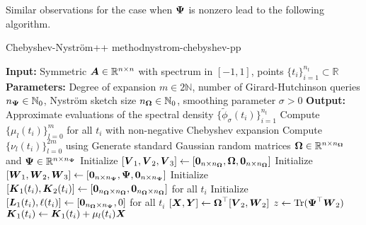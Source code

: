 \documentclass[12pt]{article}
\begin{document}
Similar observations for the case when $\boldsymbol{\Psi}$ is nonzero lead to the following algorithm.

\begin{algo}{Chebyshev-Nyström++ method}{nystrom-chebyshev-pp}
\begin{algorithmic}[1]
    \Statex \textbf{Input:} Symmetric $\boldsymbol{A} \in \mathbb{R}^{n \times n}$ with spectrum in $[-1, 1]$, points $\{t_i\}_{i=1}^{n_t} \subset \mathbb{R}$
    \Statex \textbf{Parameters:} Degree of expansion $m \in 2\mathbb{N}$, number of Girard-Hutchinson queries $n_{\boldsymbol{\Psi}} \in \mathbb{N}_0$, Nyström sketch size $n_{\boldsymbol{\Omega}} \in \mathbb{N}_0$,  smoothing parameter $\sigma > 0$
    \Statex \textbf{Output:} Approximate evaluations of the spectral density $\{\widetilde{\phi}_{\sigma}(t_i)\}_{i=1}^{n_t}$
    \State Compute $\{\mu_l(t_i)\}_{l=0}^{m}$ for all $t_i$ with non-negative Chebyshev expansion 
    \State Compute $\{\nu_l(t_i)\}_{l=0}^{2m}$ using %
    \State Generate standard Gaussian random matrices $\boldsymbol{\Omega} \in \mathbb{R}^{n \times n_{\boldsymbol{\Omega}}}$ and $\boldsymbol{\Psi} \in \mathbb{R}^{n \times n_{\boldsymbol{\Psi}}}$%
    \State Initialize $[\boldsymbol{V}_1, \boldsymbol{V}_2, \boldsymbol{V}_3] \gets [\boldsymbol{0}_{n \times n_{\boldsymbol{\Omega}}}, \boldsymbol{\boldsymbol{\Omega}}, \boldsymbol{0}_{n \times n_{\boldsymbol{\Omega}}}]$
    \State Initialize $[\boldsymbol{W}_1, \boldsymbol{W}_2, \boldsymbol{W}_3] \gets [\boldsymbol{0}_{n \times n_{\boldsymbol{\Psi}}}, \boldsymbol{\Psi}, \boldsymbol{0}_{n \times n_{\boldsymbol{\Psi}}}]$
    \State Initialize $[\boldsymbol{K}_1(t_i), \boldsymbol{K}_2(t_i)] \gets [\boldsymbol{0}_{n_{\boldsymbol{\Omega}} \times n_{\boldsymbol{\Omega}}}, \boldsymbol{0}_{n_{\boldsymbol{\Omega}} \times n_{\boldsymbol{\Omega}}}]$ for all $t_i$
    \State Initialize $[\boldsymbol{L}_1(t_i), \ell(t_i)] \gets [\boldsymbol{0}_{n_{\boldsymbol{\Omega}} \times n_{\boldsymbol{\Psi}}}, 0]$ for all $t_i$
    \State $[\boldsymbol{X}, \boldsymbol{Y}] \gets \boldsymbol{\boldsymbol{\Omega}}^{\top} [\boldsymbol{V}_2, \boldsymbol{W}_2]$  
      \State $z \gets \operatorname{Tr}(\boldsymbol{\Psi}^{\top} \boldsymbol{W}_2)$
            \State $\boldsymbol{K}_1(t_i) \gets \boldsymbol{K}_1(t_i) + \mu_l(t_i) \boldsymbol{X}$ 

\end{algorithmic}
\end{algo}
\end{document}
